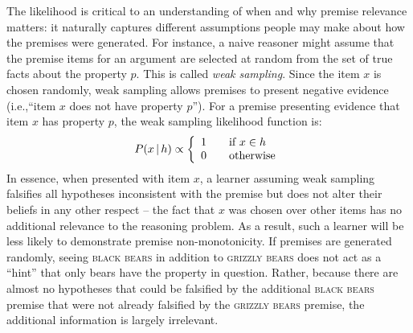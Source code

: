 \documentclass[doc,12pt]{apa}
\newcommand{\category}[1]{\textsc{#1}}
\newcommand{\given}{\, | \, } %
\begin{document}
The likelihood is critical to an understanding of when and why premise relevance matters: it naturally captures different assumptions people may make about how the premises were generated. For instance, a naive reasoner might assume that the premise items for an argument are selected at random from the set of true facts about the property $p$. This is called {\em weak sampling}.
Since the item $x$ is chosen randomly, weak sampling allows premises to present negative evidence (i.e.,``item $x$ does not have property $p$'').
For a premise presenting evidence that item $x$ has property $p$, the weak sampling likelihood function is:
\begin{equation}
\label{eqn:weaksampling}
P(x \given h) \propto \left\{
  \begin{array}{l l}
    1 & \quad \textrm{if $x \in h$} \\
    0 & \quad \textrm{otherwise}
  \end{array} \right.
\end{equation}
In essence, when presented with item $x$, a learner assuming weak sampling falsifies all hypotheses inconsistent with the premise but does not alter their beliefs in any other respect -- the fact that $x$ was chosen over other items has no additional relevance to the reasoning problem. As a result, such a learner will be less likely to demonstrate premise non-monotonicity. If premises are generated randomly, seeing \category{black bears} in addition to \category{grizzly bears} does not act as a ``hint'' that only bears have the property in question. Rather, because there are almost no hypotheses that could be falsified by the additional \category{black bears} premise that were not already falsified by the \category{grizzly bears} premise, the additional information is largely irrelevant.
\end{document}

